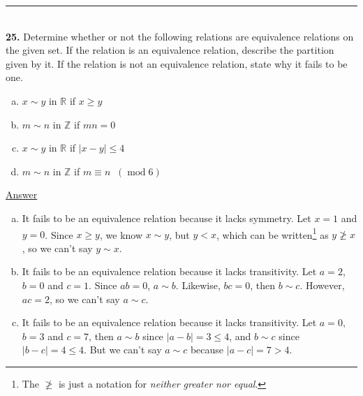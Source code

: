 \documentclass{article}[10pt]
\newenvironment{exercise}[1]
    {\noindent\rule{2cm}{0.4pt} \\
     \textbf{#1.}}
    {}
\newcommand{\answer}{

  \underline{Answer}

}
\begin{document}
\begin{exercise}{25}
  Determine whether or not
  the following relations are equivalence relations
  on the given set.
  If the relation is an equivalence relation,
  describe the partition given by it.
  If the relation is not an equivalence relation,
  state why it fails to be one.
  \begin{enumerate}[(a)]
    \item $x \sim y$ in $\mathds{R}$ if $x \ge y$
    \item $m \sim n$ in $\mathds{Z}$ if $m n = 0$
    \item $x \sim y$ in $\mathds{R}$ if $|x - y| \le 4$
    \item $m \sim n$ in $\mathds{Z}$
          if $m \equiv n \;\; (\operatorname{mod} 6)$
  \end{enumerate}
  \answer
  \begin{enumerate}[(a)]

    \item
      It fails to be an equivalence relation
      because it lacks symmetry.
      Let $x = 1$ and $y = 0$.
      Since $x \ge y$, we know $x \sim y$,
      but $y < x$,
      which can be written\footnote{
        The $\not \ge$ is just a notation for
        \emph{neither greater nor equal}.
      }
      as $y \not \ge x$,
      so we can't say $y \sim x$.

    \item
      It fails to be an equivalence relation
      because it lacks transitivity.
      Let $a = 2$, $b = 0$ and $c = 1$.
      Since $a b = 0$, $a \sim b$.
      Likewise, $b c = 0$, then $b \sim c$.
      However, $a c = 2$, so we can't say $a \sim c$.

    \item
      It fails to be an equivalence relation
      because it lacks transitivity.
      Let $a = 0$, $b = 3$ and $c = 7$,
      then $a \sim b$ since $|a - b| = 3 \le 4$,
      and $b \sim c$ since $|b - c| = 4 \le 4$.
      But we can't say $a \sim c$ because $|a - c| = 7 > 4$.


\end{enumerate}
\end{exercise}
\end{document}
